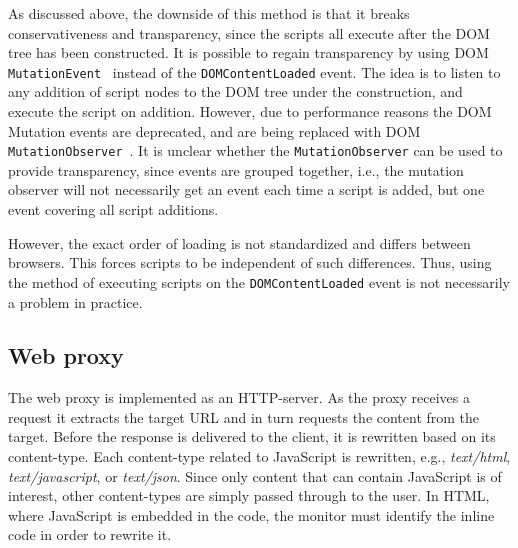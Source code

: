 \documentclass{llncs}
\begin{document}
As discussed above, the downside of this method is that it breaks
conservativeness and transparency, since the scripts all execute after the DOM
tree has been constructed. It is possible to regain transparency by using DOM
\lstinline{MutationEvent}~\cite{DOM3Event} instead of the \lstinline{DOMContentLoaded} event.  The idea is to listen
to any addition of script nodes to the DOM tree under the construction, and
execute the script on addition.  However, due to performance reasons the DOM
Mutation events are deprecated, and are being replaced with DOM \lstinline{MutationObserver}~\cite{DOM4}. 
It is unclear whether the \lstinline{MutationObserver} can be used to
provide transparency, since events are grouped together, i.e., the mutation
observer will not necessarily get an event each time a script is added, but one
event covering all script additions.

However, the exact order of loading is not standardized and differs between
browsers. This forces scripts to be independent of such differences. Thus,
using the method of executing scripts on the \lstinline{DOMContentLoaded} event is not
necessarily a problem in practice. 


\subsection{Web proxy}


The web proxy is implemented as an HTTP-server. As the 
proxy receives a request it extracts the target URL and in turn requests the 
content from the target. Before the response is delivered to the client, it is 
rewritten based on its content-type. Each content-type related to JavaScript is 
rewritten, e.g., \emph{text/html}, \emph{text/javascript}, or \emph{text/json}. 
Since only content that can contain JavaScript is of interest, other 
content-types are simply passed through to the user. In HTML, where 
JavaScript is embedded in the code, the monitor must identify 
the inline code in order to rewrite it.
\end{document}
